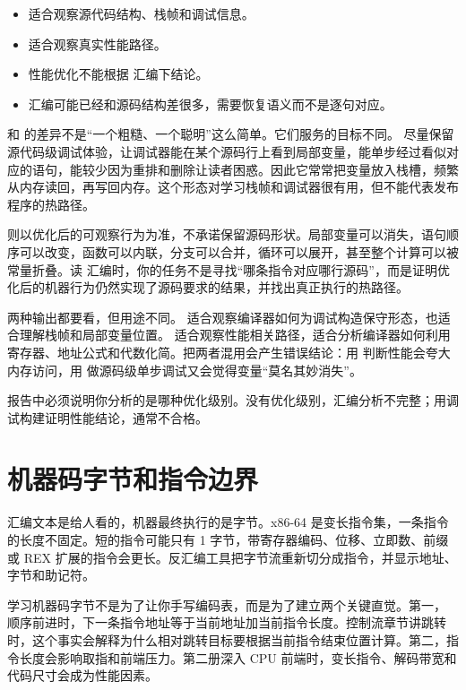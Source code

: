 \begin{itemize}
  \item {} 适合观察源代码结构、栈帧和调试信息。
  \item {} 适合观察真实性能路径。
  \item 性能优化不能根据  汇编下结论。
  \item {} 汇编可能已经和源码结构差很多，需要恢复语义而不是逐句对应。
\end{itemize}

 和  的差异不是“一个粗糙、一个聪明”这么简单。它们服务的目标不同。 尽量保留源代码级调试体验，让调试器能在某个源码行上看到局部变量，能单步经过看似对应的语句，能较少因为重排和删除让读者困惑。因此它常常把变量放入栈槽，频繁从内存读回，再写回内存。这个形态对学习栈帧和调试器很有用，但不能代表发布程序的热路径。

 则以优化后的可观察行为为准，不承诺保留源码形状。局部变量可以消失，语句顺序可以改变，函数可以内联，分支可以合并，循环可以展开，甚至整个计算可以被常量折叠。读  汇编时，你的任务不是寻找“哪条指令对应哪行源码”，而是证明优化后的机器行为仍然实现了源码要求的结果，并找出真正执行的热路径。

两种输出都要看，但用途不同。 适合观察编译器如何为调试构造保守形态，也适合理解栈帧和局部变量位置。 适合观察性能相关路径，适合分析编译器如何利用寄存器、地址公式和代数化简。把两者混用会产生错误结论：用  判断性能会夸大内存访问，用  做源码级单步调试又会觉得变量“莫名其妙消失”。

\begin{warningbox}
报告中必须说明你分析的是哪种优化级别。没有优化级别，汇编分析不完整；用调试构建证明性能结论，通常不合格。
\end{warningbox}

\section{机器码字节和指令边界}

汇编文本是给人看的，机器最终执行的是字节。x86-64 是变长指令集，一条指令的长度不固定。短的指令可能只有 1 字节，带寄存器编码、位移、立即数、前缀或 REX 扩展的指令会更长。反汇编工具把字节流重新切分成指令，并显示地址、字节和助记符。

学习机器码字节不是为了让你手写编码表，而是为了建立两个关键直觉。第一， 顺序前进时，下一条指令地址等于当前地址加当前指令长度。控制流章节讲跳转时，这个事实会解释为什么相对跳转目标要根据当前指令结束位置计算。第二，指令长度会影响取指和前端压力。第二册深入 CPU 前端时，变长指令、解码带宽和代码尺寸会成为性能因素。

